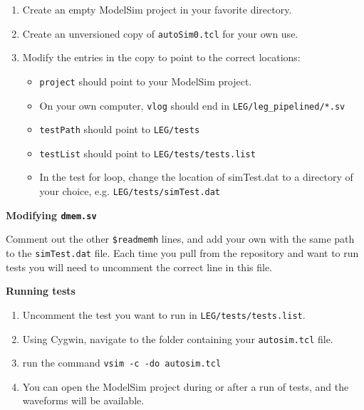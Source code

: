 \begin{enumerate}

\item Create an empty ModelSim project in your favorite directory.

\item Create an unversioned copy of \texttt{autoSim0.tcl} for your own use.

\item Modify the entries in the copy to point to the correct locations:

	\begin{itemize}

	\item \texttt{project} should point to your ModelSim project.

	\item On your own computer, \texttt{vlog} should end in \texttt{LEG/leg\_pipelined/*.sv}

	\item \texttt{testPath} should point to \texttt{LEG/tests}

	\item \texttt{testList} should point to \texttt{LEG/tests/tests.list}

	\item In the test for loop, change the location of simTest.dat to a directory 
	of your choice, e.g. \texttt{LEG/tests/simTest.dat}

	\end{itemize}

\end{enumerate}

\large \textbf{Modifying \texttt{dmem.sv}}

Comment out the other \texttt{\$readmemh} lines, and add your own with 
the same path to the \texttt{simTest.dat} file. Each time you pull from 
the repository and want to run tests you will need to uncomment 
the correct line in this file.

\bigskip
\textbf{Running tests}

\begin{enumerate}
\item Uncomment the test you want to run in \texttt{LEG/tests/tests.list}.

\item Using Cygwin, navigate to the folder containing your \texttt{autosim.tcl} file. 

\item run the command \texttt{vsim -c -do autosim.tcl}

\item You can open the ModelSim project during or after a run of tests,
and the waveforms will be available.
\end{enumerate}
